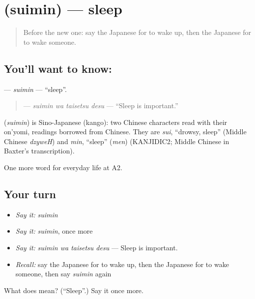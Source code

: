 \section[\texorpdfstring{\ja{すいみん} (suimin)}{すいみん (suimin)}]{ (suimin) — sleep}

\label{lesson:JA-C146-suimin}



\begin{quote}
Before the new one: say the Japanese for to wake up, then the Japanese for to wake someone.
\end{quote}

\subsection*{You'll want to know: }
\textbf{} — \emph{suimin} — \textquotedblleft{}sleep\textquotedblright{}.

\begin{quote}
\textbf{ } — \emph{suimin wa taisetsu desu} — \textquotedblleft{}Sleep is important.\textquotedblright{}
\end{quote}

\begin{cousinweb}
\textbf{} (\emph{suimin}) is Sino-Japanese (kango): two Chinese characters read with their on'yomi, readings borrowed from Chinese. They are \emph{sui}, \textquotedblleft{}drowsy, sleep\textquotedblright{} (Middle Chinese \emph{dzyweH}) and \emph{min}, \textquotedblleft{}sleep\textquotedblright{} (\emph{men}) (KANJIDIC2; Middle Chinese in Baxter's transcription).
\end{cousinweb}

\begin{grammarlens}[title={What you've built}]
One more word for everyday life at A2.
\end{grammarlens}

\subsection*{Your turn}
\begin{itemize}
\raggedright
  \item \emph{Say it:} \emph{suimin}
  \item \emph{Say it:} \emph{suimin}, once more
  \item \emph{Say it:} \emph{suimin wa taisetsu desu} — Sleep is important.
  \item \emph{Recall:} say the Japanese for to wake up, then the Japanese for to wake someone, then say \emph{suimin} again
\end{itemize}

\begin{tcolorbox}[breakable,colback=teal!4,colframe=teal!35!black,title={Before you move on}]
What does  mean? (\textquotedblleft{}Sleep\textquotedblright{}.) Say it once more.
\end{tcolorbox}
